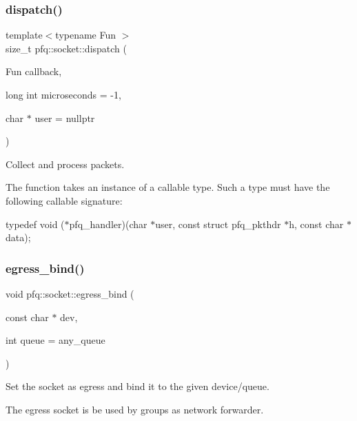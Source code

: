 \subsubsection{\texorpdfstring{dispatch()}{dispatch()}}
{\footnotesize\ttfamily template$<$typename Fun $>$ \\
size\+\_\+t pfq\+::socket\+::dispatch (\begin{DoxyParamCaption}\item[{Fun}]{callback,  }\item[{long int}]{microseconds = {\ttfamily -\/1},  }\item[{char $\ast$}]{user = {\ttfamily nullptr} }\end{DoxyParamCaption})\hspace{0.3cm}{\ttfamily [inline]}}



Collect and process packets. 

The function takes an instance of a callable type. Such a type must have the following callable signature\+:

typedef void ($\ast$pfq\+\_\+handler)(char $\ast$user, const struct pfq\+\_\+pkthdr $\ast$h, const char $\ast$data); \mbox{\label{classpfq_1_1socket_a2c96741054ea764f5d8c31295ef5df29}} 
\subsubsection{\texorpdfstring{egress\+\_\+bind()}{egress\_bind()}}
{\footnotesize\ttfamily void pfq\+::socket\+::egress\+\_\+bind (\begin{DoxyParamCaption}\item[{const char $\ast$}]{dev,  }\item[{int}]{queue = {\ttfamily any\+\_\+queue} }\end{DoxyParamCaption})\hspace{0.3cm}{\ttfamily [inline]}}



Set the socket as egress and bind it to the given device/queue. 

The egress socket is be used by groups as network forwarder. \mbox{\label{classpfq_1_1socket_ae80718e8f26cdaed3fd05bfde6d835e0}} 
